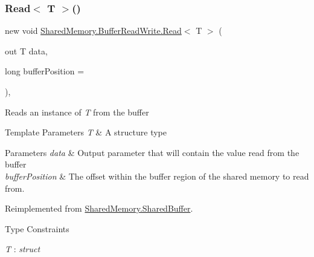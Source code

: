 \subsubsection{\texorpdfstring{Read$<$ T $>$()}{Read< T >()}\hspace{0.1cm}{\footnotesize\ttfamily [1/2]}}
{\footnotesize\ttfamily new void \hyperlink{class_shared_memory_1_1_buffer_read_write_a5d187c340e0f342a2f1be07d4f9957f7}{Shared\+Memory.\+Buffer\+Read\+Write.\+Read}$<$ T $>$ (\begin{DoxyParamCaption}\item[{out T}]{data,  }\item[{long}]{buffer\+Position = {} }\end{DoxyParamCaption})\hspace{0.3cm}{\ttfamily [inline]}, {\ttfamily [virtual]}}



Reads an instance of {\itshape T}  from the buffer 


\begin{DoxyTemplParams}{Template Parameters}
{\em T} & A structure type\\
\hline
\end{DoxyTemplParams}

\begin{DoxyParams}{Parameters}
{\em data} & Output parameter that will contain the value read from the buffer\\
\hline
{\em buffer\+Position} & The offset within the buffer region of the shared memory to read from.\\
\hline
\end{DoxyParams}


Reimplemented from \hyperlink{class_shared_memory_1_1_shared_buffer_a27d48f6be3b300882aa9aa71339421be}{Shared\+Memory.\+Shared\+Buffer}.

\begin{Desc}
\item[Type Constraints]\begin{description}
\item[{\em T} : {\em struct}]\end{description}
\end{Desc}
\mbox{\label{class_shared_memory_1_1_buffer_read_write_a3c49b75b3b06a22c73bfd26c90d220d6}} 

